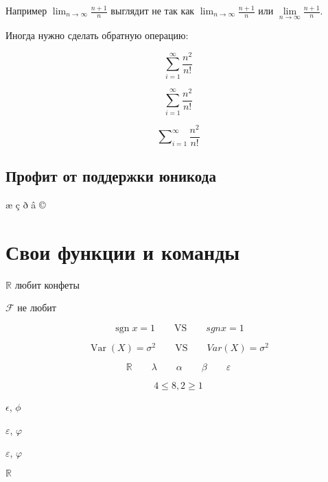\documentclass[12pt, a4paper]{article}
\DeclareMathOperator{\sgn}{sgn}
\DeclareMathOperator{\Var}{Var}
\begin{document}
Например $\lim_{n \to \infty} \frac{n+1}{n}$ выглядит не так как $\displaystyle \lim_{n \to \infty} \frac{n+1}{n}$ или $\lim\limits_{n \to \infty} \frac{n+1}{n}$.

Иногда нужно сделать обратную операцию:

\[\sum_{i=1}^{\infty} \frac{n^2}{n!} \]

\[\textstyle \sum_{i=1}^{\infty} \frac{n^2}{n!} \]

\[ \sum\nolimits_{i=1}^{\infty} \frac{n^2}{n!} \]


\subsection{Профит от поддержки юникода}

æ ç ð â ©


\section{Свои функции и команды}

\def\R{\ensuremath{\mathbb{R}}}

\def\F{\ensuremath{\mathcal{F}}{ }}

\R{ } любит конфеты  

\F не любит


\def \a{\alpha}
\def \b{\beta}
\def \la{\lambda}
\def \sg{\sigma}
\def \e{\varepsilon}

\[\sgn  x = 1 \qquad \text{VS} \qquad sgn x = 1\]

\[\Var(X) = \sigma^2 \qquad \text{VS} \qquad Var(X) = \sigma^2\]

\[ \R \qquad \la \qquad \a \qquad \b \qquad \e \]

\[ 4 \le 8, 2 \ge 1\]



$\epsilon$, $\phi$ %

\renewcommand{\phi}{\varphi}
\renewcommand{\epsilon}{\varepsilon}

$\varepsilon$, $\varphi$

$\epsilon$, $\phi$ 


\R
\end{document}
